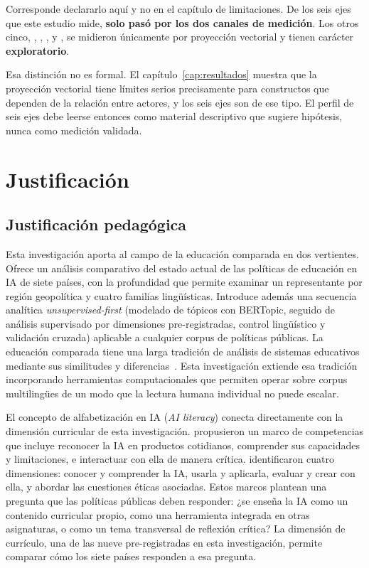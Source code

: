 Corresponde declararlo aquí y no en el capítulo de limitaciones. De los seis ejes que este estudio mide, \textbf{solo \ejedf{} pasó por los dos canales de medición}. Los otros cinco, \ren, \lipin, \yi, \xiushen{} y \hepin, se midieron únicamente por proyección vectorial y tienen carácter \textbf{exploratorio}.

Esa distinción no es formal. El capítulo~\ref{cap:resultados} muestra que la proyección vectorial tiene límites serios precisamente para constructos que dependen de la relación entre actores, y los seis ejes son de ese tipo. El perfil de seis ejes debe leerse entonces como material descriptivo que sugiere hipótesis, nunca como medición validada.


\section{Justificación}
\label{sec:justificacion}

\subsection{Justificación pedagógica}

Esta investigación aporta al campo de la educación comparada en dos vertientes. Ofrece un análisis comparativo del estado actual de las políticas de educación en IA de siete países, con la profundidad que permite examinar un representante por región geopolítica y cuatro familias lingüísticas. Introduce además una secuencia analítica \textit{unsupervised-first} (modelado de tópicos con BERTopic, seguido de análisis supervisado por dimensiones pre-registradas, control lingüístico y validación cruzada) aplicable a cualquier corpus de políticas públicas. La educación comparada tiene una larga tradición de análisis de sistemas educativos mediante sus similitudes y diferencias~\citep{milosevic2020methodology}. Esta investigación extiende esa tradición incorporando herramientas computacionales que permiten operar sobre corpus multilingües de un modo que la lectura humana individual no puede escalar.

El concepto de alfabetización en IA (\textit{AI literacy}) conecta directamente con la dimensión curricular de esta investigación. \citet{long2020ailiteracy} propusieron un marco de competencias que incluye reconocer la IA en productos cotidianos, comprender sus capacidades y limitaciones, e interactuar con ella de manera crítica. \citet{ng2021ailiteracy} identificaron cuatro dimensiones: conocer y comprender la IA, usarla y aplicarla, evaluar y crear con ella, y abordar las cuestiones éticas asociadas. Estos marcos plantean una pregunta que las políticas públicas deben responder: ¿se enseña la IA como un contenido curricular propio, como una herramienta integrada en otras asignaturas, o como un tema transversal de reflexión crítica? La dimensión de currículo, una de las nueve pre-registradas en esta investigación, permite comparar cómo los siete países responden a esa pregunta.


